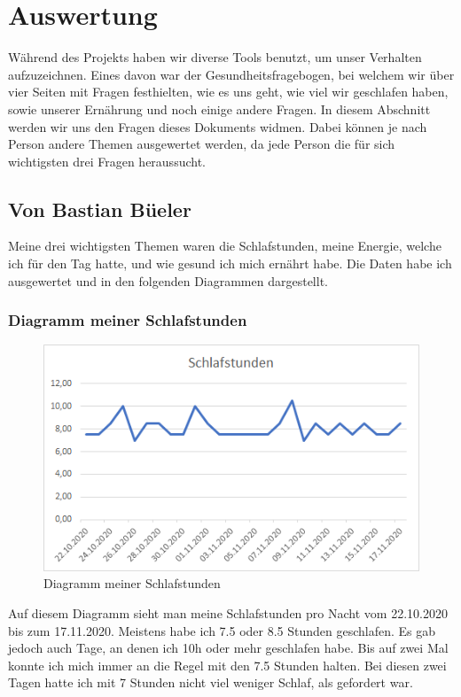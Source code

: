 \section{Auswertung}
\authortoc{\bastian}{\sectionident}
Während des Projekts haben wir diverse Tools benutzt, um unser Verhalten aufzuzeichnen. Eines davon war der Gesundheitsfragebogen, bei welchem wir über vier Seiten mit Fragen festhielten, wie es uns geht, wie viel wir geschlafen haben, sowie unserer Ernährung und noch einige andere Fragen. In diesem Abschnitt werden wir uns den Fragen dieses Dokuments widmen. Dabei können je nach Person andere Themen ausgewertet werden, da jede Person die für sich wichtigsten drei Fragen heraussucht.
\subsection{Von Bastian Büeler}
\authortoc{\bastian}{\subsectionident}
Meine drei wichtigsten Themen waren die Schlafstunden, meine Energie, welche ich für den Tag hatte, und wie gesund ich mich ernährt habe.
Die Daten habe ich ausgewertet und in den folgenden Diagrammen dargestellt.
\pagebreak
\subsubsection{Diagramm meiner Schlafstunden}
\begin{figure}[H]
  \centering
  \includegraphics[width=0.7\linewidth]{./images/bastian_schlaf.png}
  \caption{Diagramm meiner Schlafstunden }
\end{figure}
Auf diesem Diagramm sieht man meine Schlafstunden pro Nacht vom 22.10.2020 bis zum 17.11.2020. Meistens habe ich 7.5 oder 8.5 Stunden geschlafen. Es gab jedoch auch Tage, an denen ich 10h oder mehr geschlafen habe. Bis auf zwei Mal konnte ich mich immer an die Regel mit den 7.5 Stunden halten. Bei diesen zwei Tagen hatte ich mit 7 Stunden nicht viel weniger Schlaf, als gefordert war.
\pagebreak
